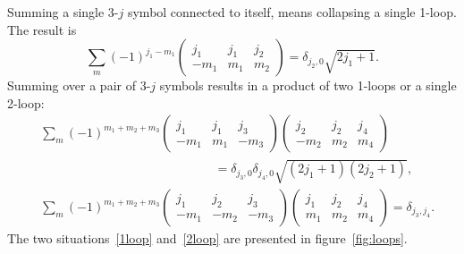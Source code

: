 Summing a single 3-$j$ symbol connected to itself, means collapsing a single 1-loop. The result is
\begin{equation}\label{1loop}
    \sum_m (-1)^{j_1-m_1}\begin{pmatrix} j_1 & j_1 & j_2 \\ -m_1 & m_1 & m_2\end{pmatrix} = \delta_{j_2,0}\sqrt{2j_1+1}.
\end{equation}
Summing over a pair of 3-$j$ symbols results in a product of two 1-loops or a single 2-loop:
\begin{align}
    &\sum_{m}(-1)^{m_1+m_2+m_3}
    \begin{pmatrix} j_1 & j_1 & j_3 \\ -m_1 & m_1 & -m_3 \end{pmatrix}
    \begin{pmatrix} j_2 & j_2 & j_4 \\ -m_2 & m_2 & m_4 \end{pmatrix} \nonumber
    \\
   & \mspace{250mu} = \delta_{j_3,0}\delta_{j_4,0}\sqrt{(2j_1+1)(2j_2+1)},\\
    &\sum_{m}(-1)^{m_1+m_2+m_3}
    \begin{pmatrix} j_1 & j_2 & j_3 \\ -m_1 & -m_2 & -m_3 \end{pmatrix}
    \begin{pmatrix} j_1 & j_2 & j_4 \\ m_1 & m_2 & m_4 \end{pmatrix}
    = \delta_{j_3,j_4}.\label{2loop}
\end{align}
The two situations~\eqref{1loop} and~\eqref{2loop} are presented in figure~\ref{fig:loops}. 

